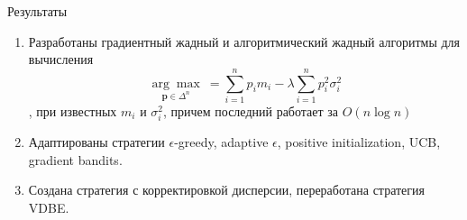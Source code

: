 \documentclass[10pt]{beamer} %
\begin{document}
\begin{frame}{Результаты}
    \begin{enumerate}
        \item <1-> Разработаны градиентный жадный и алгоритмический жадный алгоритмы для вычисления \[\underset{\textbf{p} \in \Delta^n}{\arg \max} \:
        = \sum_{i=1}^n p_i m_i - \lambda \sum_{i=1}^n p_i^2 \sigma_i^2\], при известных $m_i$ и $\sigma_i^2$, причем последний работает за $O(n \log n)$
        \item <2-> Адаптированы стратегии $\epsilon$-greedy, adaptive $\epsilon$, positive initialization, UCB, gradient bandits.
        \item <3-> Создана стратегия с корректировкой дисперсии, переработана стратегия VDBE.
    \end{enumerate}
\end{frame}
\end{document}
